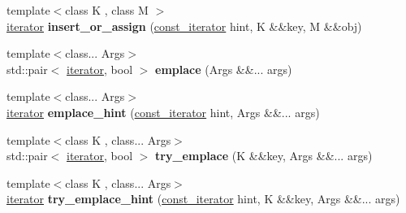\begin{DoxyCompactItemize}
\item 
\mbox{\label{classtsl_1_1detail__robin__hash_1_1robin__hash_a308d23d9b49810b22b98eb5dd1132609}} 
{\footnotesize template$<$class K , class M $>$ }\\\mbox{\hyperlink{classtsl_1_1detail__robin__hash_1_1robin__hash_1_1robin__iterator}{iterator}} {\bfseries insert\+\_\+or\+\_\+assign} (\mbox{\hyperlink{classtsl_1_1detail__robin__hash_1_1robin__hash_1_1robin__iterator}{const\+\_\+iterator}} hint, K \&\&key, M \&\&obj)
\item 
\mbox{\label{classtsl_1_1detail__robin__hash_1_1robin__hash_a4a4c1de2bdaee5a515d983ca56665dbc}} 
{\footnotesize template$<$class... Args$>$ }\\std\+::pair$<$ \mbox{\hyperlink{classtsl_1_1detail__robin__hash_1_1robin__hash_1_1robin__iterator}{iterator}}, bool $>$ {\bfseries emplace} (Args \&\&... args)
\item 
\mbox{\label{classtsl_1_1detail__robin__hash_1_1robin__hash_a8375c4c7434024d76da40509cd89c72e}} 
{\footnotesize template$<$class... Args$>$ }\\\mbox{\hyperlink{classtsl_1_1detail__robin__hash_1_1robin__hash_1_1robin__iterator}{iterator}} {\bfseries emplace\+\_\+hint} (\mbox{\hyperlink{classtsl_1_1detail__robin__hash_1_1robin__hash_1_1robin__iterator}{const\+\_\+iterator}} hint, Args \&\&... args)
\item 
\mbox{\label{classtsl_1_1detail__robin__hash_1_1robin__hash_a400f0689a0342960a00ab7b51c619f3b}} 
{\footnotesize template$<$class K , class... Args$>$ }\\std\+::pair$<$ \mbox{\hyperlink{classtsl_1_1detail__robin__hash_1_1robin__hash_1_1robin__iterator}{iterator}}, bool $>$ {\bfseries try\+\_\+emplace} (K \&\&key, Args \&\&... args)
\item 
\mbox{\label{classtsl_1_1detail__robin__hash_1_1robin__hash_ab57cd48ca50ec8968561a0c30cd4f3a1}} 
{\footnotesize template$<$class K , class... Args$>$ }\\\mbox{\hyperlink{classtsl_1_1detail__robin__hash_1_1robin__hash_1_1robin__iterator}{iterator}} {\bfseries try\+\_\+emplace\+\_\+hint} (\mbox{\hyperlink{classtsl_1_1detail__robin__hash_1_1robin__hash_1_1robin__iterator}{const\+\_\+iterator}} hint, K \&\&key, Args \&\&... args)

\end{DoxyCompactItemize}
